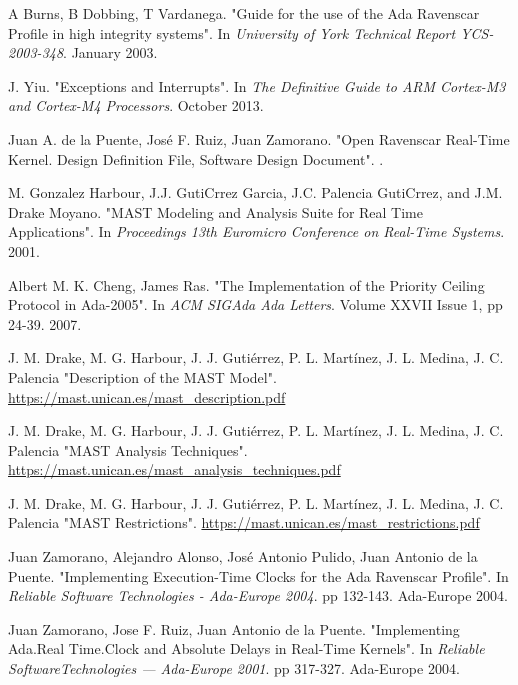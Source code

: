 \documentclass{article}
\begin{document}
\begin{thebibliography}{1}

A Burns, B Dobbing, T Vardanega.
\newblock "Guide for the use of the Ada Ravenscar Profile in high integrity systems".
\newblock In {\em University of York Technical Report YCS-2003-348}. January 2003.

J. Yiu.
\newblock "Exceptions and Interrupts".
\newblock In {\em The Definitive Guide to ARM Cortex-M3 and Cortex-M4 Processors}. October 2013.

Juan A. de la Puente, José F. Ruiz, Juan Zamorano.
\newblock "Open Ravenscar Real-Time Kernel. Design Definition File, Software Design Document".
.

M. Gonzalez Harbour, J.J. GutiCrrez Garcia, J.C. Palencia GutiCrrez, and J.M. Drake Moyano.
\newblock "MAST Modeling and Analysis Suite for Real Time Applications".
\newblock In {\em Proceedings 13th Euromicro Conference on Real-Time Systems}. 2001.

Albert M. K. Cheng, James Ras.
\newblock "The Implementation of the Priority Ceiling Protocol in Ada-2005".
\newblock In {\em ACM SIGAda Ada Letters}. Volume XXVII Issue 1, pp 24-39. 2007.

J. M. Drake, M. G. Harbour, J. J. Gutiérrez, P. L. Martínez, J. L. Medina, J. C. Palencia
\newblock "Description of the MAST Model".
\newblock \url{https://mast.unican.es/mast_description.pdf}

J. M. Drake, M. G. Harbour, J. J. Gutiérrez, P. L. Martínez, J. L. Medina, J. C. Palencia
\newblock "MAST Analysis Techniques".
\newblock \url{https://mast.unican.es/mast_analysis_techniques.pdf}

J. M. Drake, M. G. Harbour, J. J. Gutiérrez, P. L. Martínez, J. L. Medina, J. C. Palencia
\newblock "MAST Restrictions".
\newblock \url{https://mast.unican.es/mast_restrictions.pdf}

Juan Zamorano, Alejandro Alonso, José Antonio Pulido, Juan Antonio de la Puente.
\newblock "Implementing Execution-Time Clocks for the Ada Ravenscar Profile".
\newblock In {\em Reliable Software Technologies - Ada-Europe 2004}. pp 132-143. Ada-Europe 2004.

Juan Zamorano, Jose F. Ruiz, Juan Antonio de la Puente.
\newblock "Implementing Ada.Real Time.Clock and Absolute Delays in Real-Time Kernels".
\newblock In {\em Reliable SoftwareTechnologies — Ada-Europe 2001}. pp 317-327. Ada-Europe 2004.


\end{thebibliography}
\end{document}
